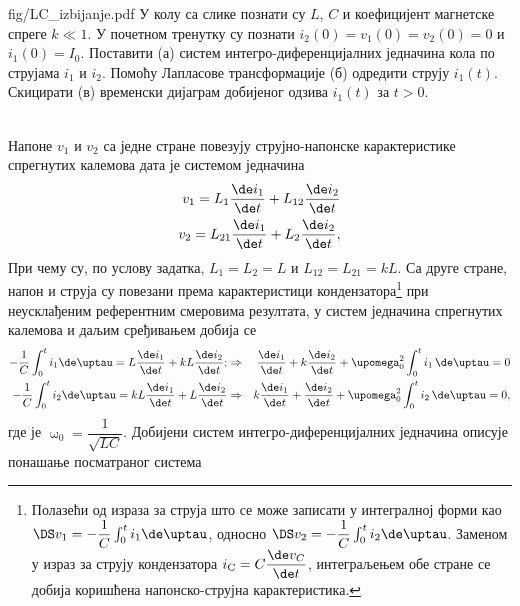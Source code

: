 \mnDifficult
\begin{slikaDesno}{fig/LC_izbijanje.pdf}
    \PID \label{z:LC_izbijanje}
     У колу са слике познати су 
    $L$, 
    $C$ и коефицијент магнетске спреге $k \ll 1$.
    У почетном тренутку су познати 
    $i_2(0) = v_1(0) = v_2(0) = 0$ и 
    $i_1(0) = I_0$. Поставити (а)
    систем 
    интегро-диференцијалних једначина кола 
    по струјама $i_1$ и $i_2$. Помоћу 
    Лапласове
    трансформације (б) одредити струју $i_1(t)$.
    Скицирати (в) временски дијаграм 
    добијеног одзива
    $i_1(t)$ за $t > 0$.
\end{slikaDesno} \\

\RESENJE 
Напоне $v_1$ и $v_2$ са једне стране повезују струјно-напонске карактеристике
спрегнутих калемова дата је системом једначина 
\begin{eqnarray}
    v_1 = L_1 \dfrac{\de i_1}{\de t} + L_{12} \dfrac{\de i_2}{\de t} \\
    v_2 = L_{21} \dfrac{\de i_1}{\de t} + L_{2} \dfrac{\de i_2}{\de t},
\end{eqnarray}
При чему су, по услову задатка, $L_1 = L_2 = L$ и $L_{12} = L_{21} = kL$. Са друге стране, 
напон и струја су повезани према карактеристици кондензатора\footnote{
Полазећи од израза за струја што се може записати у интегралној форми као 
$\DS v_{\rm 1} = - \dfrac{1}{C} \int_{0}^{t} i_1 \de \uptau$, односно
$\DS v_{\rm 2} = - \dfrac{1}{C} \int_{0}^{t} i_2 \de \uptau$.
Заменом у израз за струју кондензатора $i_{\rm C} = C \dfrac{\de v_C}{\de t}$, интеграљењем
обе стране се добија коришћена напонско-струјна карактеристика.
} при неусклађеним референтним 
смеровима резултата, у систем једначина спрегнутих калемова и даљим сређивањем добија се 
\begin{eqnarray}
    - \dfrac{1}{C} \int_{0}^{t} i_1 \de \uptau = L \dfrac{\de i_1}{\de t} + kL \dfrac{\de i_2}{\de t}; 
    & \Rightarrow & 
    \dfrac{\de i_1}{\de t} + k \dfrac{\de i_2}{\de t} + \upomega_0^2 \int_0^t i_1 \, \de \uptau = 0
    \\
    - \dfrac{1}{C} \int_{0}^{t} i_2 \de \uptau = kL \dfrac{\de i_1}{\de t} + L \dfrac{\de i_2}{\de t}
    & \Rightarrow &
    k \dfrac{\de i_1}{\de t} + \dfrac{\de i_2}{\de t} + \upomega_0^2 \int_0^t i_2 \, \de \uptau = 0,
\end{eqnarray}
где је $\upomega_0 = \dfrac{1}{\sqrt{LC}}$. Добијени систем интегро-диференцијалних једначина 
описује понашање посматраног система \\

